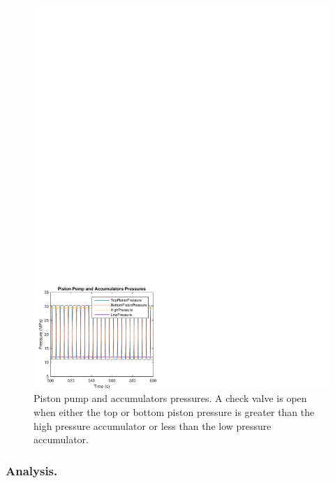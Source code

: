 \documentclass[twocolumn,10pt]{asme2e}
\begin{document}
\begin{figure}[t]
    \centering
    \includegraphics[width=1\columnwidth]{Images/Pressures}
    \caption{Piston pump and accumulators pressures. A check valve is open when either the top or bottom piston pressure is greater than the high pressure accumulator or less than the low pressure accumulator.}
    \label{HydPr}
    \end{figure}

\subsubsection*{Analysis.}    
   
\end{document}
